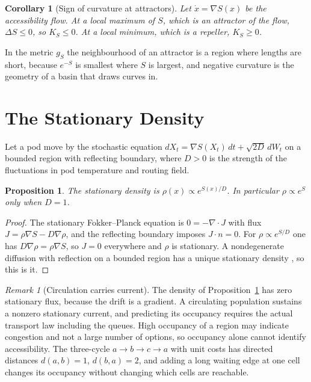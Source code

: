 \documentclass[11pt,openany]{book}
\theoremstyle{plain}
\newtheorem{proposition}[theorem]{Proposition}
\newtheorem{corollary}[theorem]{Corollary}
\theoremstyle{definition}
\theoremstyle{remark}
\newtheorem{remark}[theorem]{Remark}
\begin{document}
\begin{corollary}[Sign of curvature at attractors]
\label{cor:sign}
Let $\dot x=\nabla S(x)$ be the accessibility flow. At a local maximum of $S$, which is an attractor of the flow, $\Delta S\le 0$, so $K_S\le 0$. At a local minimum, which is a repeller, $K_S\ge 0$.
\end{corollary}

In the metric $g_S$ the neighbourhood of an attractor is a region where lengths are short, because $e^{-S}$ is smallest where $S$ is largest, and negative curvature is the geometry of a basin that draws curves in.

\section{The Stationary Density}

Let a pod move by the stochastic equation $dX_t=\nabla S(X_t)\,dt+\sqrt{2D}\,dW_t$ on a bounded region with reflecting boundary, where $D>0$ is the strength of the fluctuations in pod temperature and routing field.

\begin{proposition}
\label{prop:gibbs}
The stationary density is $\rho(x)\propto e^{S(x)/D}$. In particular $\rho\propto e^{S}$ only when $D=1$.
\end{proposition}
\begin{proof}
The stationary Fokker--Planck equation is $0=-\nabla\cdot J$ with flux $J=\rho\nabla S-D\nabla\rho$, and the reflecting boundary imposes $J\cdot n=0$. For $\rho\propto e^{S/D}$ one has $D\nabla\rho=\rho\nabla S$, so $J=0$ everywhere and $\rho$ is stationary. A nondegenerate diffusion with reflection on a bounded region has a unique stationary density \cite{risken}, so this is it.
\end{proof}

\begin{remark}[Circulation carries current]
The density of Proposition~\ref{prop:gibbs} has zero stationary flux, because the drift is a gradient. A circulating population sustains a nonzero stationary current, and predicting its occupancy requires the actual transport law including the queues. High occupancy of a region may indicate congestion and not a large number of options, so occupancy alone cannot identify accessibility. The three-cycle $a\to b\to c\to a$ with unit costs has directed distances $d(a,b)=1$, $d(b,a)=2$, and adding a long waiting edge at one cell changes its occupancy without changing which cells are reachable.
\end{remark}
\end{document}
